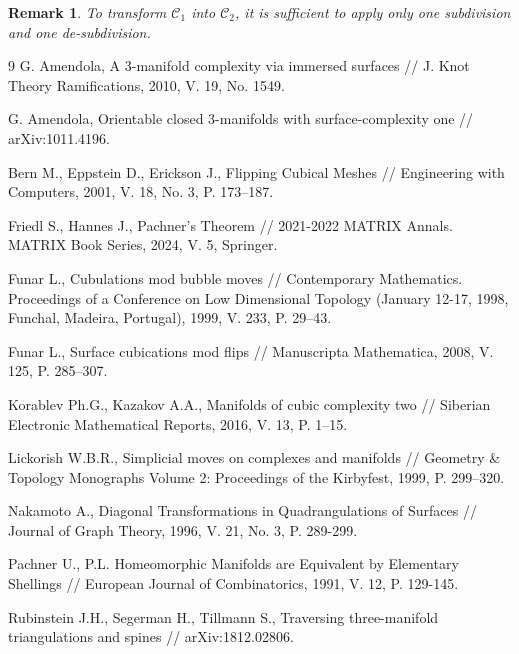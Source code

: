 \documentclass{amsart}
\newtheorem{remark}{Remark}
\begin{document}
\begin{remark}
    To transform $\mathcal{C}_1$ into $\mathcal{C}_2$, it is sufficient to apply only one subdivision and one de-subdivision.
\end{remark}


\begin{thebibliography}{9}
     G. Amendola, A 3-manifold complexity via immersed surfaces // J. Knot Theory Ramifications, 2010, V. 19, No. 1549.

     G. Amendola, Orientable closed 3-manifolds with surface-complexity one // arXiv:1011.4196.

     Bern M., Eppstein D., Erickson J., Flipping Cubical Meshes // Engineering with Computers, 2001, V. 18, No. 3, P. 173–187.

     Friedl S., Hannes J., Pachner’s Theorem // 2021-2022 MATRIX Annals. MATRIX Book Series, 2024, V. 5, Springer.

     Funar L., Cubulations mod bubble moves // Contemporary Mathematics. Proceedings of a Conference on Low Dimensional Topology (January 12-17, 1998, Funchal, Madeira, Portugal), 1999, V. 233, P. 29–43.

     Funar L., Surface cubications mod flips // Manuscripta Mathematica, 2008, V. 125, P. 285–307.

     Korablev Ph.G., Kazakov A.A., Manifolds of cubic complexity two // Siberian Electronic Mathematical Reports, 2016, V. 13, P. 1–15.
    
     Lickorish W.B.R., Simplicial moves on complexes and manifolds // Geometry \& Topology Monographs Volume 2: Proceedings of the Kirbyfest, 1999, P. 299–320.

     Nakamoto A., Diagonal Transformations in Quadrangulations of Surfaces // Journal of Graph Theory, 1996, V. 21, No. 3, P. 289-299.

     Pachner U., P.L. Homeomorphic Manifolds are Equivalent by Elementary Shellings // European Journal of Combinatorics, 1991, V. 12, P. 129-145.

     Rubinstein J.H., Segerman H., Tillmann S., Traversing three-manifold triangulations and spines // arXiv:1812.02806.

    


\end{thebibliography}
\end{document}
